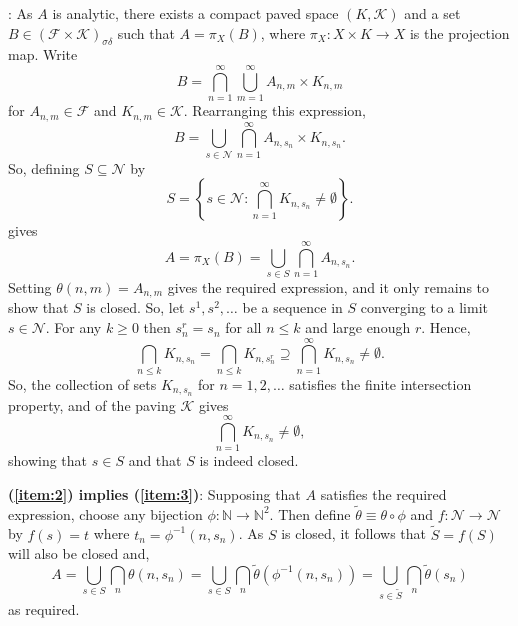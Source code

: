 \documentclass[12pt]{article}
\begin{document}
:
As $A$ is analytic, there exists a compact paved space $(K,\mathcal{K})$ and a set $B\in(\mathcal{F}\times\mathcal{K})_{\sigma\delta}$ such that $A=\pi_X(B)$, where $\pi_X\colon X\times K\to X$ is the projection map.
Write
\begin{equation*}
B=\bigcap_{n=1}^\infty\bigcup_{m=1}^\infty A_{n,m}\times K_{n,m}
\end{equation*}
for $A_{n,m}\in\mathcal{F}$ and $K_{n,m}\in\mathcal{K}$.
Rearranging this expression,
\begin{equation*}
B=\bigcup_{s\in\mathcal{N}}\bigcap_{n=1}^\infty A_{n,s_n}\times K_{n,s_n}.
\end{equation*}
So, defining $S\subseteq\mathcal{N}$ by
\begin{equation*}
S=\left\{s\in\mathcal{N}\colon \bigcap_{n=1}^\infty K_{n,s_n}\not=\emptyset\right\}.
\end{equation*}
gives
\begin{equation*}
A=\pi_X(B)=\bigcup_{s\in S}\bigcap_{n=1}^\infty A_{n,s_n}.
\end{equation*}
Setting $\theta(n,m)=A_{n,m}$ gives the required expression, and it only remains to show that $S$ is closed.
So, let $s^1,s^2,\ldots$ be a sequence in $S$ converging to a limit $s\in\mathcal{N}$. For any $k\ge 0$ then $s^r_n=s_n$ for all $n\le k$ and large enough $r$. Hence,
\begin{equation*}
\bigcap_{n\le k}K_{n,s_n}=\bigcap_{n\le k}K_{n,s^r_n}\supseteq \bigcap_{n=1}^\infty K_{n,s_n}\not=\emptyset.
\end{equation*}
So, the collection of sets $K_{n,s_n}$ for $n=1,2,\ldots$ satisfies the finite intersection property, and  of the paving $\mathcal{K}$ gives
\begin{equation*}
\bigcap_{n=1}^\infty K_{n,s_n}\not=\emptyset,
\end{equation*}
showing that $s\in S$ and that $S$ is indeed closed.

\noindent\textbf{(\ref{item:2}) implies (\ref{item:3})}:
Supposing that $A$ satisfies the required expression, choose any bijection $\phi\colon \mathbb{N}\to\mathbb{N}^2$. Then define $\tilde\theta\equiv \theta\circ\phi$ and $f\colon\mathcal{N}\to\mathcal{N}$ by $f(s)=t$ where $t_n=\phi^{-1}(n,s_n)$. As $S$ is closed, it follows that $\tilde S=f(S)$ will also be closed and,
\begin{equation*}
A=\bigcup_{s\in S}\bigcap_n\theta(n,s_n)
=\bigcup_{s\in S}\bigcap_n\tilde\theta(\phi^{-1}(n,s_n))
=\bigcup_{s\in\tilde S}\bigcap_n\tilde\theta(s_n)
\end{equation*}
as required.
\end{document}
